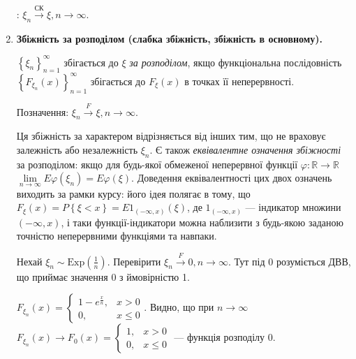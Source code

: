 \begin{enumerate}
    : $\xi_n \overset{\text{СК}}{\longrightarrow} \xi, n \to \infty$.
    \item \textbf{Збіжність за розподілом (слабка збіжність, збіжність в основному).}

    \noindent$\left\{ \xi_n\right\}_{n=1}^{\infty}$ збігається до $\xi$ \emph{за розподілом}, якщо функціональна послідовність
    $\left\{ F_{\xi_n} (x)\right\}_{n=1}^{\infty}$ збігається до $F_{\xi}(x)$ в точках її неперервності.

    Позначення: $\xi_n \overset{F}{\longrightarrow} \xi, n \to \infty$.

    Ця збіжність за характером відрізняється від інших тим, що не враховує залежність або незалежність $\xi_n$.
    Є також \emph{еквівалентне означення збіжності} за розподілом: якщо для будь-якої обмеженої неперервної функції $\varphi : \mathbb{R} \to \mathbb{R}$
    $\underset{n \to \infty}{\lim} E \varphi(\xi_n) = E\varphi(\xi)$.
    Доведення еквівалентності цих двох означень виходить за рамки курсу: його ідея полягає в тому, що $F_{\xi}(x) = P\left\{ \xi < x\right\} = E 1_{(-\infty, x)}(\xi)$,
    де $1_{(-\infty, x)}$ --- індикатор множини $(-\infty, x)$, і таки функції-індикатори можна наблизити з будь-якою заданою точністю неперервними функціями та навпаки.
    \begin{example}
        Нехай $\xi_n \sim \mathrm{Exp}(\frac{1}{n})$. Перевірити $\xi_n \overset{F}{\to} 0, n \to \infty$.
        Тут під 0 розуміється ДВВ, що приймає значення 0 з ймовірністю 1.

        $F_{\xi_n}(x) = \begin{cases}
            1 - e^{\frac{x}{n}}, & x > 0 \\
            0, & x \leq 0
        \end{cases}$. Видно, що при $n \to \infty$ $F_{\xi_n}(x) \to F_0(x) = \begin{cases}
            1, & x > 0 \\
            0, & x \leq 0
        \end{cases}
        $ --- функція розподілу 0.
    \end{example}
\end{enumerate}

